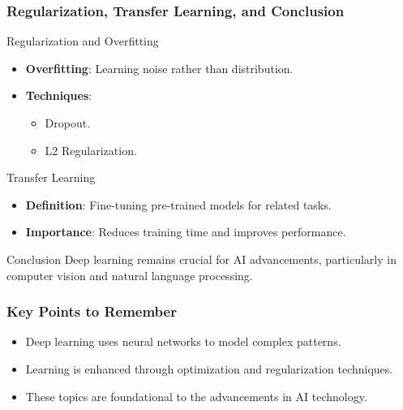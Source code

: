 \documentclass[aspectratio=169]{beamer}
\begin{document}
\begin{frame}[fragile]
    \frametitle{Regularization, Transfer Learning, and Conclusion}

    \begin{block}{Regularization and Overfitting}
        \begin{itemize}
            \item \textbf{Overfitting}: Learning noise rather than distribution.
            \item \textbf{Techniques}:
            \begin{itemize}
                \item Dropout.
                \item L2 Regularization.
            \end{itemize}
        \end{itemize}
    \end{block}

    \begin{block}{Transfer Learning}
        \begin{itemize}
            \item \textbf{Definition}: Fine-tuning pre-trained models for related tasks.
            \item \textbf{Importance}: Reduces training time and improves performance.
        \end{itemize}
    \end{block}

    \begin{block}{Conclusion}
        Deep learning remains crucial for AI advancements, particularly in computer vision and natural language processing. 
    \end{block}
\end{frame}

\begin{frame}[fragile]
    \frametitle{Key Points to Remember}
    \begin{itemize}
        \item Deep learning uses neural networks to model complex patterns.
        \item Learning is enhanced through optimization and regularization techniques.
        \item These topics are foundational to the advancements in AI technology.
    \end{itemize}
\end{frame}
\end{document}
